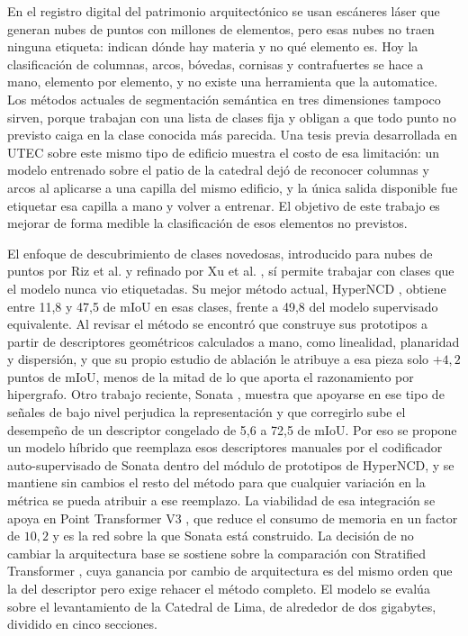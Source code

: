 
En el registro digital del patrimonio arquitectónico se usan escáneres láser que
generan nubes de puntos con millones de elementos, pero esas nubes no traen
ninguna etiqueta: indican dónde hay materia y no qué elemento es. Hoy la
clasificación de columnas, arcos, bóvedas, cornisas y contrafuertes se hace a
mano, elemento por elemento, y no existe una herramienta que la automatice. Los
métodos actuales de segmentación semántica en tres dimensiones tampoco sirven,
porque trabajan con una lista de clases fija y obligan a que todo punto no
previsto caiga en la clase conocida más parecida. Una tesis previa desarrollada en
UTEC sobre este mismo tipo de edificio \cite{tesisutec2024} muestra el costo de
esa limitación: un modelo entrenado sobre el patio de la catedral dejó de
reconocer columnas y arcos al aplicarse a una capilla del mismo edificio, y la
única salida disponible fue etiquetar esa capilla a mano y volver a entrenar. El
objetivo de este trabajo es mejorar de forma medible la clasificación de esos
elementos no previstos.

El enfoque de descubrimiento de clases novedosas, introducido para nubes de puntos
por Riz et al. \cite{riz2023nops} y refinado por Xu et al. \cite{xu2024dasl}, sí
permite trabajar con clases que el modelo nunca vio etiquetadas. Su mejor método
actual, HyperNCD \cite{zhang2026hyperncd}, obtiene entre 11,8 y 47,5 de mIoU en
esas clases, frente a 49,8 del modelo supervisado equivalente. Al revisar el
método se encontró que construye sus prototipos a partir de descriptores
geométricos calculados a mano, como linealidad, planaridad y dispersión, y que su
propio estudio de ablación le atribuye a esa pieza solo $+4{,}2$ puntos de mIoU,
menos de la mitad de lo que aporta el razonamiento por hipergrafo. Otro trabajo
reciente, Sonata \cite{wu2025sonata}, muestra que apoyarse en ese tipo de señales
de bajo nivel perjudica la representación y que corregirlo sube el desempeño de un
descriptor congelado de 5,6 a 72,5 de mIoU. Por eso se propone un modelo híbrido
que reemplaza esos descriptores manuales por el codificador auto-supervisado de
Sonata dentro del módulo de prototipos de HyperNCD, y se mantiene sin cambios el
resto del método para que cualquier variación en la métrica se pueda atribuir a
ese reemplazo. La viabilidad de esa integración se apoya en Point Transformer V3
\cite{wu2024ptv3}, que reduce el consumo de memoria en un factor de $10{,}2$ y es
la red sobre la que Sonata está construido. La decisión de no cambiar la
arquitectura base se sostiene sobre la comparación con Stratified Transformer
\cite{lai2022stratified}, cuya ganancia por cambio de arquitectura es del mismo
orden que la del descriptor pero exige rehacer el método completo. El modelo se
evalúa sobre el levantamiento de la Catedral de Lima, de alrededor de dos
gigabytes, dividido en cinco secciones.

